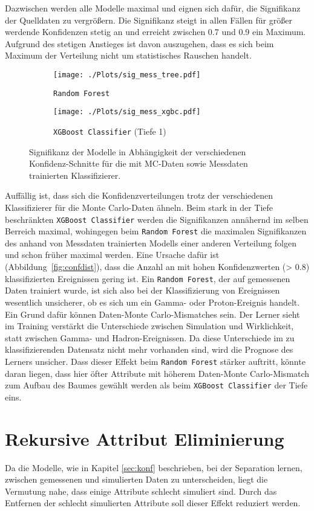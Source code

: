 Dazwischen werden alle Modelle maximal und eignen sich dafür, die Signifikanz der Quelldaten zu vergrößern.
Die Signifikanz steigt in allen Fällen für größer werdende Konfidenzen stetig an und erreicht zwischen \num{0.7} und \num{0.9} ein Maximum.
Aufgrund des stetigen Anstieges ist davon auszugehen, dass es sich beim Maximum der Verteilung nicht um statistisches Rauschen handelt.
\begin{figure}[H]
  \centering
  \begin{subfigure}[b]{0.48\textwidth}
  \centering
  \texttt{[image: ./Plots/sig\_mess\_tree.pdf]}
  \caption{\texttt{Random Forest}}
  \label{fig:signconfMC}
\end{subfigure}
\begin{subfigure}[b]{0.48\textwidth}
  \centering
  \texttt{[image: ./Plots/sig\_mess\_xgbc.pdf]}
  \caption{\texttt{XGBoost Classifier} (Tiefe 1)}
  \label{fig:signconfMESS}
\end{subfigure}
\caption{Signifikanz der Modelle in Abhängigkeit der verschiedenen Konfidenz-Schnitte für die mit MC-Daten sowie Messdaten trainierten Klassifizierer.}
\label{fig:signconf}
\end{figure}
Auffällig ist, dass sich die Konfidenzverteilungen trotz der verschiedenen Klassifizierer für die Monte Carlo-Daten ähneln.
Beim stark in der Tiefe beschränkten \texttt{XGBoost Classifier} werden die Signifikanzen annähernd im selben Berreich maximal, wohingegen beim \texttt{Random Forest} die maximalen Signifikanzen des anhand von Messdaten trainierten Modells einer anderen Verteilung folgen und schon früher maximal werden. 
Eine Ursache dafür ist (Abbildung~\ref{fig:confdist}), dass die Anzahl an mit hohen Konfidenzwerten (\num{> 0.8}) klassifizierten Ereignissen gering ist. 
Ein \texttt{Random Forest}, der auf gemessenen Daten trainiert wurde, ist sich also bei der Klassifizierung von Ereignissen wesentlich unsicherer, ob es sich um ein Gamma- oder Proton-Ereignis handelt.
Ein Grund dafür können Daten-Monte Carlo-Mismatches sein. 
Der Lerner sieht im Training verstärkt die Unterschiede zwischen Simulation und Wirklichkeit, statt zwischen Gamma- und Hadron-Ereignissen.
Da diese Unterschiede im zu klassifizierenden Datensatz nicht mehr vorhanden sind, wird die Prognose des Lerners unsicher.
Dass dieser Effekt beim \texttt{Random Forest} stärker auftritt, könnte daran liegen, dass hier öfter Attribute mit höherem Daten-Monte Carlo-Mismatch zum Aufbau des Baumes gewählt werden als beim \texttt{XGBoost Classifier} der Tiefe eins.
\newpage
\section{Rekursive Attribut Eliminierung}
Da die Modelle, wie in Kapitel \ref{sec:konf} beschrieben, bei der Separation lernen, zwischen gemessenen und simulierten Daten zu unterscheiden, liegt die Vermutung nahe, dass einige Attribute schlecht simuliert sind.
Durch das Entfernen der schlecht simulierten Attribute soll dieser Effekt reduziert werden.

